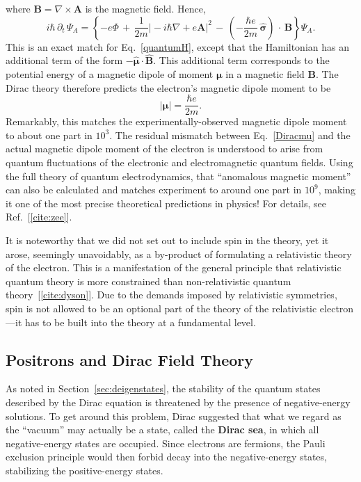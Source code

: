 \documentclass[pra,12pt]{revtex4}
\begin{document}
where $\mathbf{B} = \nabla\times\mathbf{A}$ is the magnetic field.
Hence,
\begin{equation}
  i\hbar\, \partial_t \, \Psi_A
  = \left\{-e\Phi
  \,+\, \frac{1}{2m} \big|-i\hbar\nabla +e\mathbf{A} \big|^2
  \,-\, \left(-\frac{\hbar e}{2m}\, \hat{\boldsymbol{\sigma}}\right)
  \,\cdot\, \mathbf{B} \right\} \Psi_A.
\end{equation}
This is an exact match for Eq.~\eqref{quantumH}, except that the
Hamiltonian has an additional term of the form $-
\hat{\boldsymbol{\mu}} \cdot \hat{\mathbf{B}}$.  This additional term
corresponds to the potential energy of a magnetic dipole of moment
$\boldsymbol{\mu}$ in a magnetic field $\mathbf{B}$.  The Dirac theory
therefore predicts the electron's magnetic dipole moment to be
\begin{equation}
  |\boldsymbol{\mu}| = \frac{\hbar e}{2m}.
  \label{Diracmu}
\end{equation}
Remarkably, this matches the experimentally-observed magnetic dipole
moment to about one part in $10^3$.  The residual mismatch between
Eq.~\eqref{Diracmu} and the actual magnetic dipole moment of the
electron is understood to arise from quantum fluctuations of the
electronic and electromagnetic quantum fields.  Using the full theory
of quantum electrodynamics, that ``anomalous magnetic moment'' can
also be calculated and matches experiment to around one part in
$10^9$, making it one of the most precise theoretical predictions in
physics!  For details, see Ref.~[\ref{cite:zee}].

It is noteworthy that we did not set out to include spin in the
theory, yet it arose, seemingly unavoidably, as a by-product of
formulating a relativistic theory of the electron.  This is a
manifestation of the general principle that relativistic quantum
theory is more constrained than non-relativistic quantum
theory~[\ref{cite:dyson}].  Due to the demands imposed by relativistic
symmetries, spin is not allowed to be an optional part of the theory
of the relativistic electron---it has to be built into the theory at a
fundamental level.

\subsection{Positrons and Dirac Field Theory}
\label{sec:positrons}

As noted in Section~\ref{sec:deigenstates}, the stability of the
quantum states described by the Dirac equation is threatened by the
presence of negative-energy solutions.  To get around this problem,
Dirac suggested that what we regard as the ``vacuum'' may actually be
a state, called the \textbf{Dirac sea}, in which all negative-energy
states are occupied.  Since electrons are fermions, the Pauli
exclusion principle would then forbid decay into the negative-energy
states, stabilizing the positive-energy states.
\end{document}
